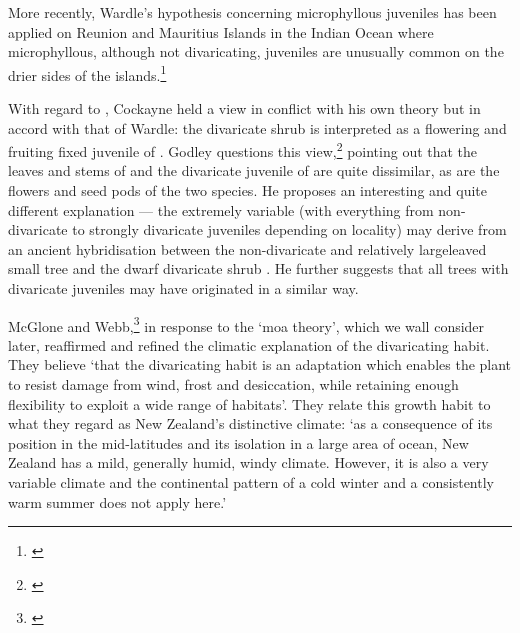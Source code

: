 More recently, Wardle's hypothesis concerning microphyllous juveniles has been applied on Reunion and Mauritius Islands in the Indian Ocean where microphyllous, although not divaricating, juveniles are unusually common on the drier sides of the islands.\footnote{\cite{friedmann1976observations}}

With regard to , Cockayne held a view in conflict with his own theory but in accord with that of Wardle: the divaricate shrub  is interpreted as a flowering and fruiting fixed juvenile of .
Godley questions this view,\footnote{\cite{godley1979leonard}} pointing out that the leaves and stems of  and the divaricate juvenile of  are quite dissimilar, as are the flowers and seed pods of the two species.
He proposes an interesting and quite different explanation --- the extremely variable  (with everything from non-divaricate to strongly divaricate juveniles depending on locality) may derive from an ancient hybridisation between the non-divaricate and relatively largeleaved small tree  and the dwarf divaricate shrub .
He further suggests that all trees with divaricate juveniles may have originated in a similar way.

McGlone and Webb,\footnote{\cite{mcglone1981selective}} in response to the `moa theory', which we wall consider later, reaffirmed and refined the climatic explanation of the divaricating habit.
They believe `that the divaricating habit is an adaptation which enables the plant to resist damage from wind, frost and desiccation, while retaining enough flexibility to exploit a wide range of habitats'.
They relate this growth habit to what they regard as New Zealand's distinctive climate: `as a consequence of its position in the mid-latitudes and its isolation in a large area of ocean, New Zealand has a mild, generally humid, windy climate.
However, it is also a very variable climate and the continental pattern of a cold winter and a consistently warm summer does not apply here.'

